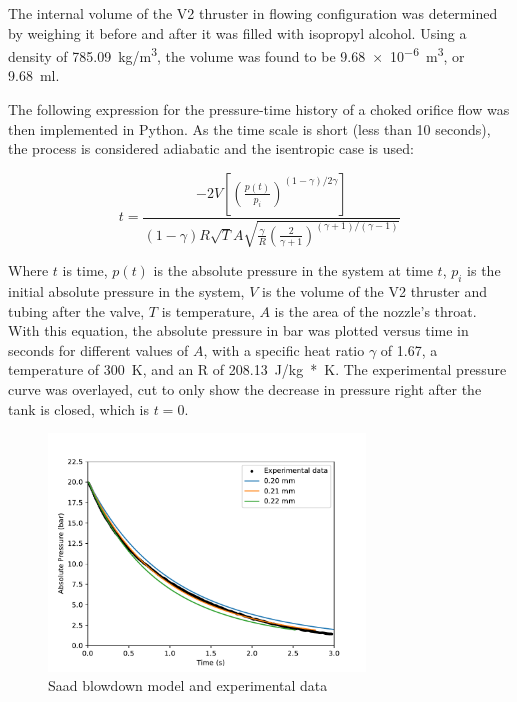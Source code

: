 

            The internal volume of the V2 thruster in flowing configuration was determined by weighing it before and after it was filled with isopropyl alcohol. Using a density of \qty{785.09}{kg/m^3}, the volume was found to be \qty{9.68e-6}{m^3}, or \qty{9.68}{ml}.

            The following expression for the pressure-time history  of a choked orifice flow was then implemented in Python. As the time scale is short (less than 10 seconds), the process is considered adiabatic and the isentropic case is used:

            \begin{equation}
                t =  \frac{-2V \left[\left(\frac{p(t)}{p_i}\right)^{(1-\gamma) / 2\gamma}\right]}{(1-\gamma) R \sqrt{T} A \sqrt{\frac{\gamma}{R}(\frac{2}{\gamma + 1})^{(\gamma+1) / (\gamma-1)}}}
            \end{equation}

            Where $t$ is time, $p(t)$ is the absolute pressure in the system at time $t$, $p_i$ is the initial absolute pressure in the system, $V$ is the volume of the V2 thruster and tubing after the valve, $T$ is temperature, $A$ is the area of the nozzle's throat.  With this equation, the absolute pressure in bar was plotted versus time in seconds for different values of $A$, with a specific heat ratio $\gamma$ of 1.67, a temperature of \qty{300}{K}, and an R of \qty{208.13}{J/kg*K}. The experimental pressure curve was overlayed, cut to only show the decrease in pressure right after the tank is closed, which is $t=0$.

            \begin{figure}[!ht]
                \centering
                \includegraphics[width=0.75\textwidth]{assets/4 experiments/Saad blowdown fit.pdf}
                \caption{Saad blowdown model and experimental data}
            \end{figure}

